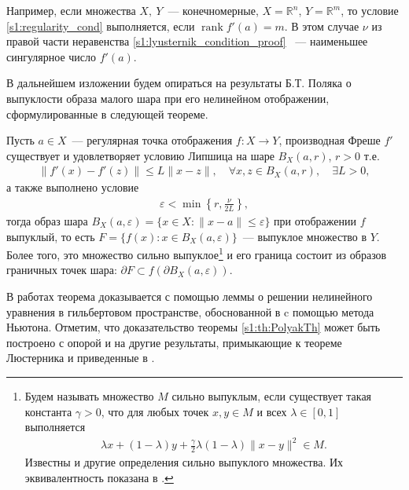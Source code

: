\documentclass[../main.tex]{subfiles}
\begin{document}
Например, если множества $X,\ Y$~--- конечномерные, $X = \mathbb{R}^n$, $Y = \mathbb{R}^m$, то условие \eqref{s1:regularity_cond} выполняется, если  $ \operatorname{rank} f'(a) = m$.
В этом случае $\nu$ из правой части неравенства \eqref{s1:lyusternik_condition_proof} ~--- наименьшее сингулярное число $f'(a)$. 

В дальнейшем изложении будем опираться на результаты Б.Т. Поляка о выпуклости образа малого шара при его нелинейном отображении, сформулированные в следующей теореме. 
\begin{theorem}\label{s1:th:PolyakTh}
    Пусть $a \in X$~--- регулярная точка отображения $f: X \rightarrow Y$, производная Фреше $f'$ существует и удовлетворяет условию Липшица на шаре  $B_X(a,r) $, $r > 0$  т.е. 
    \begin{gather*}%
        \| f'(x) - f'(z) \| \leqslant L \| x - z \|, \quad \forall x,z \in B_X(a,r), \quad \exists L > 0,
    \end{gather*}
    а также выполнено условие
    \begin{gather*}
        \varepsilon < \min\left\{r,\frac{\nu}{2L}\right\},
    \end{gather*}
    тогда образ шара $B_X(a,\varepsilon) = \{x \in X: \| x - a\| \leqslant \varepsilon\}$ при отображении $f$ выпуклый, то есть $F = \{f(x): x \in B_X(a,\varepsilon)\}$~--- выпуклое множество в $Y$.
    Более того, это множество сильно выпуклое\footnote
    {Будем называть множество $M $ сильно выпуклым, если существует такая константа $\gamma > 0$, что для любых точек $x, y \in M$ и всех $\lambda \in [0, 1]$ выполняется 
    \begin{gather*}
    	\lambda x + (1 - \lambda) y + \frac{\gamma}{2}\lambda (1 - \lambda) \| x - y \|^2 \in M.
    \end{gather*}
Известны и другие определения сильно выпуклого множества. Их эквивалентность показана в \cite{vial}.}
     и его граница состоит из образов граничных точек шара: $\partial F \subset f(\partial B_X(a,\varepsilon))$.
\end{theorem}
    
В работах \cite{Polyak2001, Polyak2001ru} теорема доказывается с помощью леммы о решении нелинейного уравнения в гильбертовом пространстве, обоснованной в \cite{Polyak1964} c помощью метода Ньютона.
Отметим, что доказательство теоремы \ref{s1:th:PolyakTh} может быть построено с опорой и на другие результаты, примыкающие к теореме Люстерника и приведенные в \cite{Dmitruk1980, Ioffe}.
    
\end{document}
